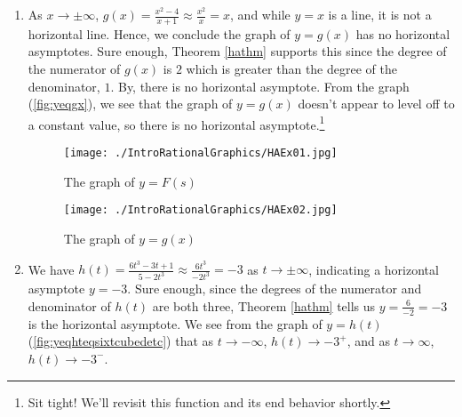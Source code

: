 \begin{ex}
\begin{enumerate}
\item  As $x \rightarrow \pm \infty$, $g(x) = \frac{x^2-4}{x+1} \approx \frac{x^2}{x} = x$, and while $y = x$ is a line, it is not a horizontal line.  Hence, we conclude the graph of $y = g(x)$ has no horizontal asymptotes.  Sure enough,  Theorem \ref{hathm} supports this since the degree of the numerator of $g(x)$ is $2$ which is greater than the degree of the denominator, $1$.     By, there is no horizontal asymptote.  From the graph (\autoref{fig:yeqgx}), we see that the graph of $y=g(x)$ doesn't appear to level off to a constant value, so there is no horizontal asymptote.\footnote{Sit tight!  We'll revisit this function and its end behavior shortly.}

\begin{figure}
\begin{center}

\texttt{[image: ./IntroRationalGraphics/HAEx01.jpg]}

\caption{The graph of $y=F(s)$}
\label{fig:yeqfseqfivesetc}
\end{center}
\end{figure}

\begin{figure}
\begin{center}
  
\texttt{[image: ./IntroRationalGraphics/HAEx02.jpg]}
\caption{The graph of $y=g(x)$}
\label{fig:yeqgx}
\end{center}
\end{figure}

\item  We have $h(t) = \frac{6t^3-3t+1}{5-2t^3} \approx  \frac{6t^3}{-2t^3} = -3$ as $t \rightarrow \pm \infty$, indicating a horizontal asymptote $y = -3$.  Sure enough, since the degrees of the numerator and denominator of $h(t)$ are both three,  Theorem \ref{hathm} tells us $y = \frac{6}{-2} = -3$ is the horizontal asymptote.  We see from the graph of $y = h(t)$ (\autoref{fig:yeqhteqsixtcubedetc}) that as $t \rightarrow -\infty$, $h(t) \rightarrow -3^{+}$, and as $t \rightarrow \infty$, $h(t) \rightarrow -3^{-}$.


\end{enumerate}
\end{ex}
